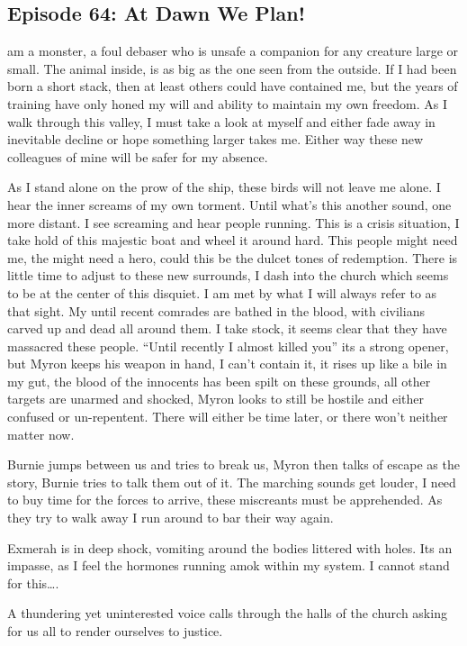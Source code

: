 \subsection{Episode 64: At Dawn We Plan!}

 am a monster, a foul debaser who is unsafe a companion for any creature large or small. The animal inside, is as big as the one seen from the outside. If I had been born a short stack, then at least others could have contained me, but the years of training have only honed my will and ability to maintain my own freedom. As I walk through this valley, I must take a look at myself and either fade away in inevitable decline or hope something larger takes me. Either way these new colleagues of mine will be safer for my absence.\medskip

As I stand alone on the prow of the ship, these birds will not leave me alone. I hear the inner screams of my own torment. Until what’s this another sound, one more distant. I see screaming and hear people running. This is a crisis situation, I take hold of this majestic boat and wheel it around hard. This people might need me, the might need a hero, could this be the dulcet tones of redemption. There is little time to adjust to these new surrounds, I dash into the church which seems to be at the center of this disquiet. I am met by what I will always refer to as that sight. My until recent comrades are bathed in the blood, with civilians carved up and dead all around them. I take stock, it seems clear that they have massacred these people. “Until recently I almost killed you” its a strong opener, but Myron keeps his weapon in hand, I can’t contain it, it rises up like a bile in my gut, the blood of the innocents has been spilt on these grounds, all other targets are unarmed and shocked, Myron looks to still be hostile and either confused or un-repentent. There will either be time later, or there won’t neither matter now.\medskip

Burnie jumps between us and tries to break us, Myron then talks of escape as the story, Burnie tries to talk them out of it. The marching sounds get louder, I need to buy time for the forces to arrive, these miscreants must be apprehended. As they try to walk away I run around to bar their way again.\medskip

Exmerah is in deep shock, vomiting around the bodies littered with holes. Its an impasse, as I feel the hormones running amok within my system. I cannot stand for this….\medskip

A thundering yet uninterested voice calls through the halls of the church asking for us all to render ourselves to justice.\medskip

